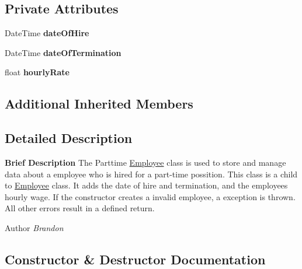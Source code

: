 \subsection*{Private Attributes}
\begin{DoxyCompactItemize}
\item 
\hypertarget{class_all_employees_1_1_parttime_employee_ae9217b6e9531dd5f6ac9029982bab405}{}Date\+Time {\bfseries date\+Of\+Hire}\label{class_all_employees_1_1_parttime_employee_ae9217b6e9531dd5f6ac9029982bab405}

\item 
\hypertarget{class_all_employees_1_1_parttime_employee_a98a60c754150cb7ff049b1a6f9eea5bc}{}Date\+Time {\bfseries date\+Of\+Termination}\label{class_all_employees_1_1_parttime_employee_a98a60c754150cb7ff049b1a6f9eea5bc}

\item 
\hypertarget{class_all_employees_1_1_parttime_employee_abbd98191b1a250e7910012c51f85bcea}{}float {\bfseries hourly\+Rate}\label{class_all_employees_1_1_parttime_employee_abbd98191b1a250e7910012c51f85bcea}

\end{DoxyCompactItemize}
\subsection*{Additional Inherited Members}


\subsection{Detailed Description}
{\bfseries Brief Description} The Parttime \hyperlink{class_all_employees_1_1_employee}{Employee} class is used to store and manage data about a employee who is hired for a part-\/time possition. This class is a child to \hyperlink{class_all_employees_1_1_employee}{Employee} class. It adds the date of hire and termination, and the employees hourly wage. If the constructor creates a invalid employee, a exception is thrown. All other errors result in a defined return. 

\begin{DoxyAuthor}{Author}
{\itshape Brandon} 
\end{DoxyAuthor}


\subsection{Constructor \& Destructor Documentation}
\hypertarget{class_all_employees_1_1_parttime_employee_aefdb20ed1cc9fb007068380a97e3f51e}{}
